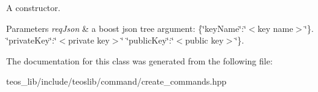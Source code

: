 A constructor. 


\begin{DoxyParams}{Parameters}
{\em req\+Json} & a boost json tree argument\+: \{\char`\"{}key\+Name\char`\"{}\+:\char`\"{}$<$key name$>$\char`\"{}\}. \char`\"{}private\+Key\char`\"{}\+:\char`\"{}$<$private key$>$\char`\"{} \char`\"{}public\+Key\char`\"{}\+:\char`\"{}$<$public key$>$\char`\"{}\}. \\
\hline
\end{DoxyParams}


The documentation for this class was generated from the following file\+:\begin{DoxyCompactItemize}
\item 
teos\+\_\+lib/include/teoslib/command/create\+\_\+commands.\+hpp\end{DoxyCompactItemize}
